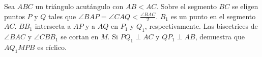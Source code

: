 Sea $ABC$ un triángulo acutángulo con $AB\lt AC$. Sobre el segmento $BC$ se eligen puntos $P$ y $Q$ tales que $\angle BAP = \angle CAQ \lt \frac{\angle BAC}{2}$. $B_1$ es un punto en el segmento $AC$. $BB_1$ intersecta a $AP$ y a $AQ$ en $P_1$ y $Q_1$, respectivamente. Las bisectrices de $\angle BAC$ y $\angle CBB_1$ se cortan en $M.$ Si $PQ_1\perp AC$ y $QP_1\perp AB$, demuestra que $AQ_1MPB$ es cíclico.